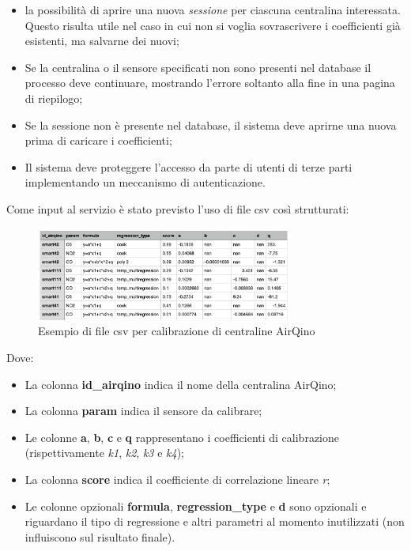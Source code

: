 \begin{itemize}
  \item la possibilità di aprire una nuova \textit{sessione} per ciascuna centralina interessata. Questo risulta utile nel caso in cui non si voglia sovrascrivere i coefficienti già esistenti, ma salvarne dei nuovi;
  \item Se la centralina o il sensore specificati non sono presenti nel database il processo deve continuare, mostrando l'errore soltanto alla fine in una pagina di riepilogo;
  \item Se la sessione non è presente nel database, il sistema deve aprirne una nuova prima di caricare i coefficienti;
  \item Il sistema deve proteggere l'accesso da parte di utenti di terze parti implementando un meccanismo di autenticazione.
\end{itemize}

Come input al servizio è stato previsto l'uso di file csv così strutturati:

\begin{figure}[H]
\centering
\includegraphics[width=0.75\textwidth,height=\textheight,keepaspectratio]{img/csv_calib}
\caption{Esempio di file csv per calibrazione di centraline AirQino}
\label{fig:csv-calib}
\end{figure}

Dove: 

\begin{itemize}
  \item La colonna \textbf{id\_airqino} indica il nome della centralina AirQino;
  \item La colonna \textbf{param} indica il sensore da calibrare;
  \item Le colonne \textbf{a}, \textbf{b}, \textbf{c} e \textbf{q} rappresentano i coefficienti di calibrazione (rispettivamente \textit{k1}, \textit{k2}, \textit{k3} e \textit{k4});
  \item La colonna \textbf{score} indica il coefficiente di correlazione lineare \textit{r};
  \item Le colonne opzionali \textbf{formula}, \textbf{regression\_type} e \textbf{d} sono opzionali e riguardano il tipo di regressione e altri parametri al momento inutilizzati (non influiscono sul risultato finale).
\end{itemize}

